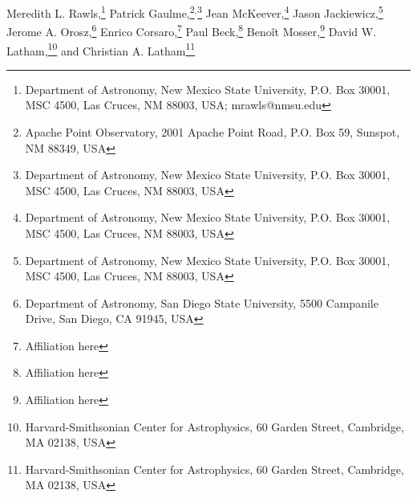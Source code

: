 Meredith L. Rawls,\footnote{Department of Astronomy, New Mexico State University, P.O. Box 30001, MSC 4500, Las Cruces, NM 88003, USA; mrawls@nmsu.edu}
\setcounter{footnote}{1}
Patrick Gaulme,\footnote{Apache Point Observatory, 2001 Apache Point Road, P.O. Box 59, Sunspot, NM 88349, USA}\setcounter{footnote}{0}$^{,}$\footnote{Department of Astronomy, New Mexico State University, P.O. Box 30001, MSC 4500, Las Cruces, NM 88003, USA}
\setcounter{footnote}{0}
Jean McKeever,\footnote{Department of Astronomy, New Mexico State University, P.O. Box 30001, MSC 4500, Las Cruces, NM 88003, USA}
\setcounter{footnote}{0}
Jason Jackiewicz,\footnote{Department of Astronomy, New Mexico State University, P.O. Box 30001, MSC 4500, Las Cruces, NM 88003, USA}
\setcounter{footnote}{2}
Jerome A. Orosz,\footnote{Department of Astronomy, San Diego State University, 5500 Campanile Drive, San Diego, CA 91945, USA}
Enrico Corsaro,\footnote{Affiliation here}
Paul Beck,\footnote{Affiliation here}
Beno\^it Mosser,\footnote{Affiliation here}
David W. Latham,\footnote{Harvard-Smithsonian Center for Astrophysics, 60 Garden Street, Cambridge, MA 02138, USA}
and
\setcounter{footnote}{6}
Christian A. Latham\footnote{Harvard-Smithsonian Center for Astrophysics, 60 Garden Street, Cambridge, MA 02138, USA}